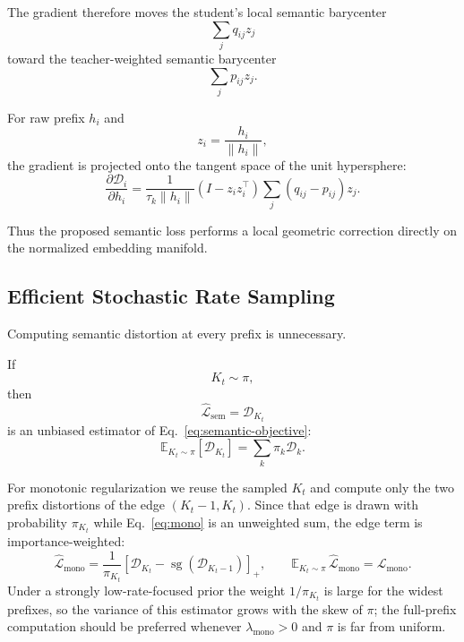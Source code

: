 \documentclass[11pt]{article}
\newcommand{\E}{\mathbb{E}}
\newcommand{\cL}{\mathcal{L}}
\newcommand{\cD}{\mathcal{D}}
\newcommand{\sg}{\operatorname{sg}}
\begin{document}
The gradient therefore moves the student's local semantic barycenter
\begin{equation}
    \sum_j q_{ij}z_j
\end{equation}
toward the teacher-weighted semantic barycenter
\begin{equation}
    \sum_j p_{ij}z_j.
\end{equation}

For raw prefix $h_i$ and
\begin{equation}
    z_i=\frac{h_i}{\|h_i\|},
\end{equation}
the gradient is projected onto the tangent space of the unit hypersphere:
\begin{equation}
\boxed{
    \frac{\partial\cD_i}{\partial h_i}
    =
    \frac{1}{
        \tau_k\|h_i\|
    }
    (I-z_i z_i^\top)
    \sum_j(q_{ij}-p_{ij})z_j.
}
\end{equation}

Thus the proposed semantic loss performs a local geometric correction directly on the normalized embedding manifold.


\subsection{Efficient Stochastic Rate Sampling}

Computing semantic distortion at every prefix is unnecessary.

If
\begin{equation}
    K_t\sim\pi,
\end{equation}
then
\begin{equation}
    \widehat{\cL}_{\mathrm{sem}}
    =
    \cD_{K_t}
\end{equation}
is an unbiased estimator of Eq.~\eqref{eq:semantic-objective}:
\begin{equation}
    \E_{K_t\sim\pi}
    [
        \cD_{K_t}
    ]
    =
    \sum_k\pi_k\cD_k.
\end{equation}

For monotonic regularization we reuse the sampled $K_t$ and compute only the two prefix distortions of the edge $(K_t-1,K_t)$.
Since that edge is drawn with probability $\pi_{K_t}$ while Eq.~\eqref{eq:mono} is an unweighted sum, the edge term is importance-weighted:
\begin{equation}
    \widehat{\cL}_{\mathrm{mono}}
    =
    \frac{1}{\pi_{K_t}}
    \left[
        \cD_{K_t}-\sg(\cD_{K_t-1})
    \right]_+,
    \qquad
    \E_{K_t\sim\pi}\,\widehat{\cL}_{\mathrm{mono}}
    =
    \cL_{\mathrm{mono}}.
\end{equation}
Under a strongly low-rate-focused prior the weight $1/\pi_{K_t}$ is large for the widest prefixes, so the variance of this estimator grows with the skew of $\pi$; the full-prefix computation should be preferred whenever $\lambda_{\mathrm{mono}}>0$ and $\pi$ is far from uniform.
\end{document}
